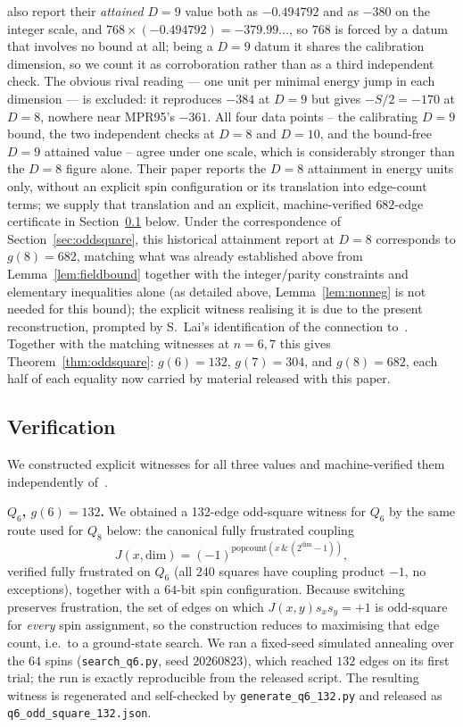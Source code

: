 \documentclass[12pt,a4paper]{article}
\theoremstyle{definition}
\begin{document}
also report their \emph{attained} $D=9$ value both as $-0.494792$ and as
$-380$ on the integer scale, and $768\times(-0.494792)=-379.99\ldots$, so $768$
is forced by a datum that involves no bound at all; being a $D=9$ datum it
shares the calibration dimension, so we count it as corroboration rather than
as a third independent check. The obvious rival reading
--- one unit per minimal energy jump in each dimension --- is excluded: it
reproduces $-384$ at $D=9$ but gives $-S/2=-170$ at $D=8$, nowhere near
MPR95's $-361$. All four data points -- the calibrating $D=9$ bound, the two
independent checks at $D=8$ and $D=10$, and the bound-free $D=9$ attained
value -- agree under one scale, which is considerably stronger than the
$D=8$ figure alone.
Their paper reports
the $D=8$ attainment in energy units only, without an explicit spin configuration
or its translation into edge-count terms; we supply that translation
and an explicit, machine-verified $682$-edge certificate in
Section~\ref{sec:oddsquareverify} below. Under the correspondence of
Section~\ref{sec:oddsquare}, this historical attainment report at $D=8$
corresponds to $g(8)=682$, matching what was already established above
from Lemma~\ref{lem:fieldbound} together with the
integer/parity constraints and elementary inequalities alone (as
detailed above, Lemma~\ref{lem:nonneg} is not needed for this bound);
the explicit
witness realising it
is due to the present reconstruction, prompted by S.~Lai's
identification of the connection to~\cite{DPTV79,MPR95}. Together with
the matching witnesses at $n=6,7$ this gives
Theorem~\ref{thm:oddsquare}: $g(6)=132$, $g(7)=304$, and $g(8)=682$,
each half of each equality now carried by material released with this
paper.

\subsection{Verification}\label{sec:oddsquareverify}

We constructed explicit witnesses for all three values and
machine-verified them independently of~\cite{DPTV79,MPR95,HN94}.

\textbf{$Q_6$, $g(6)=132$.} We obtained a 132-edge odd-square witness
for $Q_6$ by the same route used for $Q_8$ below: the canonical fully
frustrated coupling
\[
J(x,\mathrm{dim})=(-1)^{\mathrm{popcount}(x\,\&\,(2^{\mathrm{dim}}-1))},
\]
verified fully frustrated on $Q_6$ (all $240$ squares have coupling
product $-1$, no exceptions), together with a $64$-bit spin
configuration. Because switching preserves frustration, the set of
edges on which $J(x,y)s_xs_y=+1$ is odd-square for \emph{every} spin
assignment, so the construction reduces to maximising that edge count,
i.e.\ to a ground-state search. We ran a fixed-seed simulated
annealing over the $64$ spins (\texttt{search\_q6.py}, seed
$20260823$), which reached $132$ edges on its first trial; the run is
exactly reproducible from the released script. The resulting witness is
regenerated and self-checked by \texttt{generate\_q6\_132.py} and
released as \texttt{q6\_odd\allowbreak\_square\_132.json}.
\end{document}
